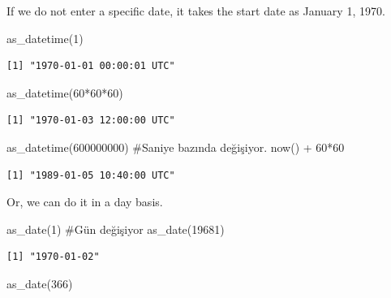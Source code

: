 \documentclass[
  letterpaper,
  DIV=11,
  numbers=noendperiod]{scrartcl}
\newenvironment{Shaded}{\begin{snugshade}}{\end{snugshade}}
\newcommand{\CommentTok}[1]{\textcolor[rgb]{0.37,0.37,0.37}{#1}}
\newcommand{\DecValTok}[1]{\textcolor[rgb]{0.68,0.00,0.00}{#1}}
\newcommand{\FunctionTok}[1]{\textcolor[rgb]{0.28,0.35,0.67}{#1}}
\newcommand{\NormalTok}[1]{\textcolor[rgb]{0.00,0.23,0.31}{#1}}
\newcommand{\SpecialCharTok}[1]{\textcolor[rgb]{0.37,0.37,0.37}{#1}}
\begin{document}
If we do not enter a specific date, it takes the start date as January
1, 1970.

\begin{Shaded}
\begin{Highlighting}[]
\FunctionTok{as\_datetime}\NormalTok{(}\DecValTok{1}\NormalTok{) }
\end{Highlighting}
\end{Shaded}

\begin{verbatim}
[1] "1970-01-01 00:00:01 UTC"
\end{verbatim}

\begin{Shaded}
\begin{Highlighting}[]
\FunctionTok{as\_datetime}\NormalTok{(}\DecValTok{60}\SpecialCharTok{*}\DecValTok{60}\SpecialCharTok{*}\DecValTok{60}\NormalTok{) }
\end{Highlighting}
\end{Shaded}

\begin{verbatim}
[1] "1970-01-03 12:00:00 UTC"
\end{verbatim}

\begin{Shaded}
\begin{Highlighting}[]
\FunctionTok{as\_datetime}\NormalTok{(}\DecValTok{600000000}\NormalTok{) }\CommentTok{\#Saniye bazında değişiyor. now() + 60*60 }
\end{Highlighting}
\end{Shaded}

\begin{verbatim}
[1] "1989-01-05 10:40:00 UTC"
\end{verbatim}

Or, we can do it in a day basis.

\begin{Shaded}
\begin{Highlighting}[]
\FunctionTok{as\_date}\NormalTok{(}\DecValTok{1}\NormalTok{) }\CommentTok{\#Gün değişiyor as\_date(19681)}
\end{Highlighting}
\end{Shaded}

\begin{verbatim}
[1] "1970-01-02"
\end{verbatim}

\begin{Shaded}
\begin{Highlighting}[]
\FunctionTok{as\_date}\NormalTok{(}\DecValTok{366}\NormalTok{)}
\end{Highlighting}
\end{Shaded}
\end{document}

